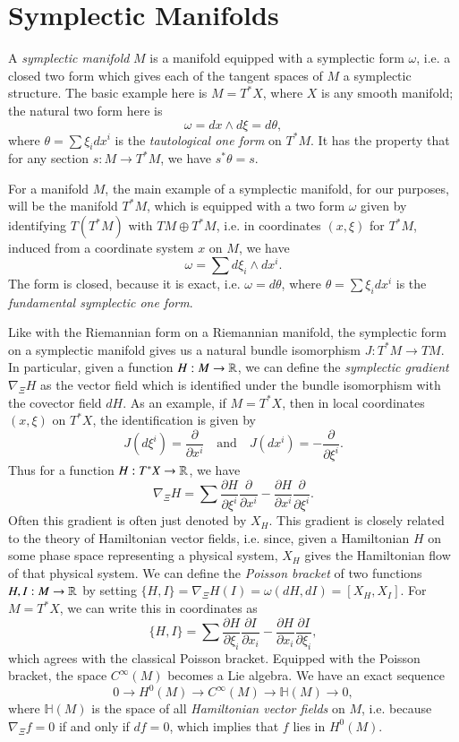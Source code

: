 \section{Symplectic Manifolds}

A \emph{symplectic manifold} $M$ is a manifold equipped with a symplectic form $\omega$, i.e. a closed two form which gives each of the tangent spaces of $M$ a symplectic structure. The basic example here is $M = T^* X$, where $X$ is any smooth manifold; the natural two form here is
%
\[ \omega = dx \wedge d\xi = d \theta, \]
%
where $\theta = \sum \xi_i dx^i$ is the \emph{tautological one form} on $T^* M$. It has the property that for any section $s: M \to T^* M$, we have $s^* \theta = s$.

\begin{example}
    For a manifold $M$, the main example of a symplectic manifold, for our purposes, will be the manifold $T^* M$, which is equipped with a two form $\omega$ given by identifying $T(T^* M)$ with $TM \oplus T^*M$, i.e. in coordinates $(x,\xi)$ for $T^* M$, induced from a coordinate system $x$ on $M$, we have
    \[ \omega = \sum d\xi_i \wedge dx^i. \]
    The form is closed, because it is exact, i.e. $\omega = d \theta$, where $\theta = \sum \xi_i dx^i$ is the \emph{fundamental symplectic one form}.
\end{example}

Like with the Riemannian form on a Riemannian manifold, the symplectic form on a symplectic manifold gives us a natural bundle isomorphism $J: T^*M \to TM$. In particular, given a function $H : M \to \operatorname{\mathbb{R}}$, we can define the \emph{symplectic gradient} $\nabla_{\Xi} H$ as the vector field which is identified under the bundle isomorphism with the covector field $dH$. As an example, if $M = T^* X$, then in local coordinates $(x,\xi)$ on $T^* X$, the identification is given by
%
\[ J(d\xi^i) = \frac{\partial}{\partial x^i} \quad\text{and}\quad J \left( dx^i \right) = - \frac{\partial}{\partial \xi^i}. \]
%
Thus for a function $H: T^* X \to \operatorname{\mathbb{R}}$, we have
%
\[ \nabla_{\Xi} H = \sum \frac{\partial H}{\partial \xi^i} \frac{\partial}{\partial x^i} - \frac{\partial H}{\partial x^i} \frac{\partial}{\partial \xi^i}. \]
%
Often this gradient is often just denoted by $X_H$. This gradient is closely related to the theory of Hamiltonian vector fields, i.e. since, given a Hamiltonian $H$ on some phase space representing a physical system, $X_H$ gives the Hamiltonian flow of that physical system. We can define the \emph{Poisson bracket} of two functions $H,I: M \to \operatorname{\mathbb{R}}$ by setting $\{ H, I \} = \nabla_\Xi H (I) = \omega(dH, dI) = [X_H, X_I]$. For $M = T^* X$, we can write this in coordinates as
%
\[ \{ H, I \} = \sum \frac{\partial H}{\partial \xi_i} \frac{\partial I}{\partial x_i} - \frac{\partial H}{\partial x_i} \frac{\partial I}{\partial \xi_i}, \]
%
which agrees with the classical Poisson bracket. Equipped with the Poisson bracket, the space $C^\infty(M)$ becomes a Lie algebra. We have an exact sequence
%
\[ 0 \to H^0(M) \to C^\infty(M) \to \mathbb{H}(M) \to 0, \]
%
where $\mathbb{H}(M)$ is the space of all \emph{Hamiltonian vector fields} on $M$, i.e. because $\nabla_\Xi f = 0$ if and only if $df = 0$, which implies that $f$ lies in $H^0(M)$.

